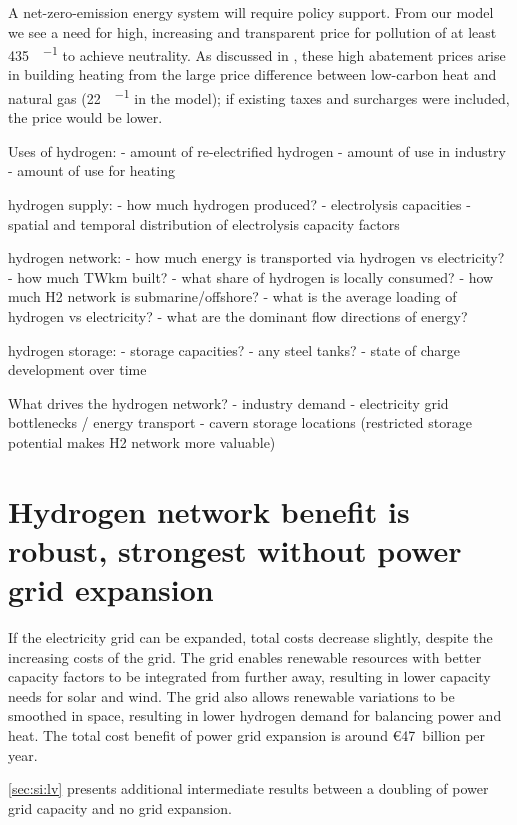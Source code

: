 A net-zero-emission energy system will require policy support. From our model we
see a need for high, increasing and transparent price for \co pollution of
at least \SI{435}{\sieuro\per\tco} to achieve \co neutrality. As discussed in
\cite{brownSynergiesSector2018}, these high abatement prices arise in building
heating from the large price difference between low-carbon heat and natural gas
(\SI{22}{\sieuro\per\mwh} in the model); if existing taxes and surcharges were
included, the \co price would be lower.

Uses of hydrogen:
- amount of re-electrified hydrogen
- amount of use in industry
- amount of use for heating

hydrogen supply:
- how much hydrogen produced?
- electrolysis capacities
- spatial and temporal distribution of electrolysis capacity factors

hydrogen network:
- how much energy is transported via hydrogen vs electricity?
- how much TWkm built?
- what share of hydrogen is locally consumed?
- how much H2 network is submarine/offshore?
- what is the average loading of hydrogen vs electricity?
- what are the dominant flow directions of energy?

hydrogen storage:
- storage capacities?
- any steel tanks?
- state of charge development over time

What drives the hydrogen network?
- industry demand
- electricity grid bottlenecks / energy transport
- cavern storage locations (restricted storage potential makes H2 network more valuable)

\section*{Hydrogen network benefit is robust, strongest without power grid expansion}
\label{sec:h2}

If the electricity grid can be expanded, total costs decrease
slightly, despite the increasing costs of the grid. The grid enables
renewable resources with better capacity factors to be integrated from
further away, resulting in lower capacity needs for solar and
wind. The grid also allows renewable variations to be smoothed in space,
resulting in lower hydrogen demand for balancing power and heat. The
total cost benefit of power grid expansion is around
\euro47~billion per year.

\cref{sec:si:lv} presents additional intermediate results between a doubling of
power grid capacity and no grid expansion.

